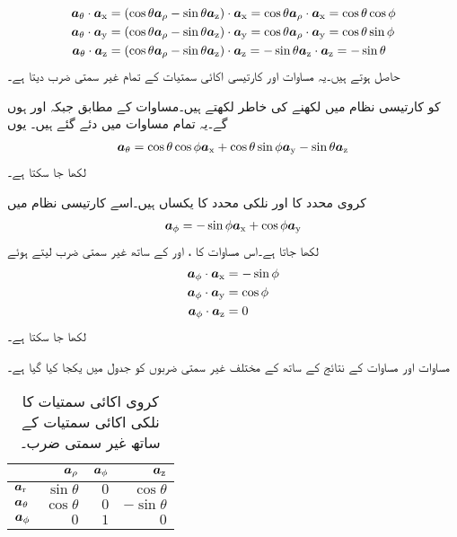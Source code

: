 \begin{gather}
\begin{aligned}\label{مساوات_سمتیہ_کروی_تھیٹا_کے_کارتیسی_اجزاء}
\atheta \cdot \ax&=(\cos \theta \arho-\sin \theta \az) \cdot \ax=\cos \theta \arho \cdot \ax=\cos \theta \cos \phi\\
\atheta \cdot \ay&=(\cos \theta \arho-\sin \theta \az) \cdot \ay=\cos \theta \arho \cdot \ay=\cos \theta \sin \phi \\
\atheta \cdot \az&=(\cos \theta \arho-\sin \theta \az) \cdot \az=-\sin \theta \az \cdot \az=-\sin \theta
\end{aligned}
\end{gather}
حاصل ہوتے ہیں۔یہ مساوات  اور کارتیسی اکائی سمتیات کے تمام غیر سمتی ضرب دیتا ہے۔

 کو کارتیسی نظام میں لکھنے کی خاطر  لکھتے ہیں۔مساوات  کے مطابق  جبکہ  اور  ہوں گے۔یہ تمام  مساوات  میں دئے گئے ہیں۔ یوں
\begin{align}
\atheta=\cos \theta \cos \phi \ax+\cos \theta \sin \phi\ay-\sin \theta\az
\end{align}  
لکھا جا سکتا ہے۔

کروی  محدد کا  اور نلکی محدد کا  یکساں ہیں۔اسے کارتیسی نظام میں
\begin{align}
\aphi=-\sin \phi \ax+\cos \phi \ay
\end{align} 
لکھا جاتا ہے۔اس مساوات کا ،  اور  کے ساتھ غیر سمتی ضرب لیتے ہوئے
\begin{gather}
\begin{aligned}
\aphi \cdot \ax&=-\sin \phi\\
\aphi \cdot \ay&=\cos \phi\\
\aphi \cdot \az&=0
\end{aligned}
\end{gather}
لکھا جا سکتا ہے۔

مساوات  اور مساوات  کے نتائج کے ساتھ  کے مختلف غیر سمتی ضربوں کو جدول  میں یکجا کیا گیا ہے۔

\begin{table}
\caption{کروی  اکائی سمتیات کا نلکی اکائی سمتیات کے ساتھ غیر سمتی ضرب۔}
\centering
\begin{tabular}{l | r r r}
 & $\arho$ & $\aphi$ & $\az$ \\
\hline
$\ar$ & $\sin \theta$ & $0$& $\cos \theta$\\
$\atheta$ &$\cos \theta$ &$ 0$ &$ -\sin \theta$\\
$\aphi$ & $0$ &$ 1$ &$0$
\end{tabular}
\label{جدول_سمتیہ_کروی_نلکی_اکائی_غیر-سمتی_ضرب}
\end{table}
%

